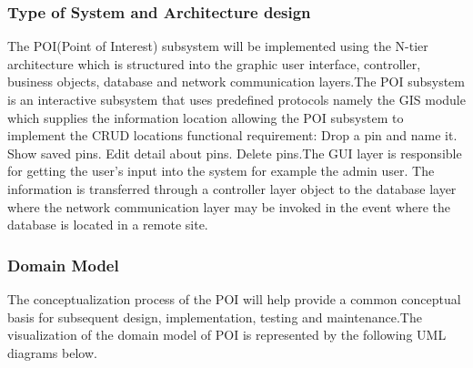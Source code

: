 \documentclass{article}
\begin{document}
 		\subsubsection{Type of System and Architecture design}
The POI(Point of Interest) subsystem will be implemented using the N-tier architecture which is structured into the graphic user interface, controller, business objects, database and network communication layers.The POI subsystem is an interactive subsystem that uses predeﬁned protocols namely the GIS module which supplies the information location allowing the POI subsystem to implement the CRUD locations functional requirement: Drop a pin and name it. Show saved pins. Edit detail about pins. Delete pins.The GUI layer is responsible for getting the user’s input into the system for example the admin user. The information is transferred through a controller layer object to the database layer where the network communication layer may be invoked in the event where the database is located in a remote site.
		\subsubsection{Domain Model }
The conceptualization process of the POI will help provide a common conceptual basis for subsequent design, implementation, testing and maintenance.The visualization of the domain model of POI is represented by the following UML diagrams below.
				
\end{document}
